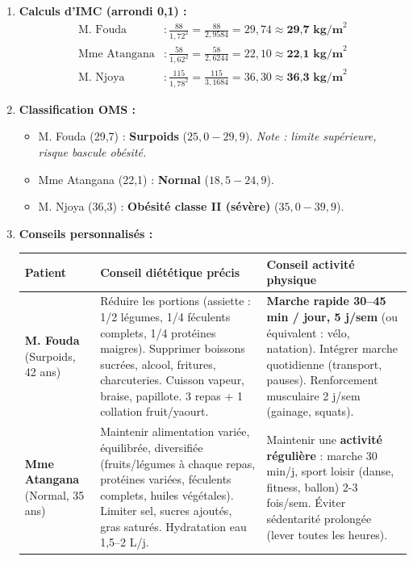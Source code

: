\documentclass[11pt]{article}
\begin{document}
\begin{corrige}
\begin{enumerate}
    \item \textbf{Calculs d'IMC (arrondi 0,1) :}
    \begin{align*}
        \text{M. Fouda} &: \frac{88}{1,72^2} = \frac{88}{2,9584} = 29,74 \approx \textbf{29,7 kg/m}^2 \\
        \text{Mme Atangana} &: \frac{58}{1,62^2} = \frac{58}{2,6244} = 22,10 \approx \textbf{22,1 kg/m}^2 \\
        \text{M. Njoya} &: \frac{115}{1,78^2} = \frac{115}{3,1684} = 36,30 \approx \textbf{36,3 kg/m}^2
    \end{align*}
    \item \textbf{Classification OMS :}
    \begin{itemize}
        \item M. Fouda (29,7) : \textbf{Surpoids} ($25,0 - 29,9$). \textit{Note : limite supérieure, risque bascule obésité.}
        \item Mme Atangana (22,1) : \textbf{Normal} ($18,5 - 24,9$).
        \item M. Njoya (36,3) : \textbf{Obésité classe II (sévère)} ($35,0 - 39,9$).
    \end{itemize}
    \item \textbf{Conseils personnalisés :}
    \begin{center}
    \begin{tabularx}{\linewidth}{|l|X|X|}\hline
    \rowcolor{popblueL}
    \textbf{Patient} & \textbf{Conseil diététique précis} & \textbf{Conseil activité physique} \\ \hline
    \textbf{M. Fouda} (Surpoids, 42 ans) & Réduire les portions (assiette : 1/2 légumes, 1/4 féculents complets, 1/4 protéines maigres). Supprimer boissons sucrées, alcool, fritures, charcuteries. Cuisson vapeur, braise, papillote. 3 repas + 1 collation fruit/yaourt. & \textbf{Marche rapide 30–45 min / jour, 5 j/sem} (ou équivalent : vélo, natation). Intégrer marche quotidienne (transport, pauses). Renforcement musculaire 2 j/sem (gainage, squats). \\ \hline
    \textbf{Mme Atangana} (Normal, 35 ans) & Maintenir alimentation variée, équilibrée, diversifiée (fruits/légumes à chaque repas, protéines variées, féculents complets, huiles végétales). Limiter sel, sucres ajoutés, gras saturés. Hydratation eau 1,5–2 L/j. & Maintenir une \textbf{activité régulière} : marche 30 min/j, sport loisir (danse, fitness, ballon) 2-3 fois/sem. Éviter sédentarité prolongée (lever toutes les heures). \\ \hline

\end{tabularx}
\end{center}
\end{enumerate}
\end{corrige}
\end{document}
